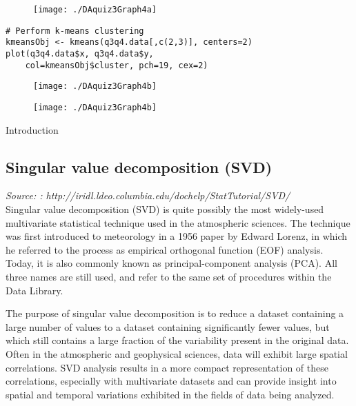 \documentclass[12pt]{article}
\begin{document}
\begin{figure}[h!]
\centering
\texttt{[image: ./DAquiz3Graph4a]}
\caption{}
\label{fig:DAquiz3Graph4a}
\end{figure}

\begin{framed}
\begin{verbatim}
# Perform k-means clustering
kmeansObj <- kmeans(q3q4.data[,c(2,3)], centers=2)
plot(q3q4.data$x, q3q4.data$y, 
    col=kmeansObj$cluster, pch=19, cex=2)
\end{verbatim}
\end{framed}
\begin{figure}
\centering
\texttt{[image: ./DAquiz3Graph4b]}
\caption{}
\label{What it should look like}
\end{figure}


\begin{figure}
\centering
\texttt{[image: ./DAquiz3Graph4b]}
\caption{}
\label{What it should look like}
\end{figure}

\newpage
\newpage

Introduction
\subsection*{Singular value decomposition (SVD)}
\textit{Source: : http://iridl.ldeo.columbia.edu/dochelp/StatTutorial/SVD/ \\}
Singular value decomposition (SVD) is quite possibly the most widely-used multivariate statistical technique used in the atmospheric sciences. The technique was first introduced to meteorology in a 1956 paper by Edward Lorenz, in which he referred to the process as empirical orthogonal function (EOF) analysis. Today, it is also commonly known as principal-component analysis (PCA). All three names are still used, and refer to the same set of procedures within the Data Library. 


The purpose of singular value decomposition is to reduce a dataset containing a large number of values to a dataset containing significantly fewer values, but which still contains a large fraction of the variability present in the original data. Often in the atmospheric and geophysical sciences, data will exhibit large spatial correlations. SVD analysis results in a more compact representation of these correlations, especially with multivariate datasets and can provide insight into spatial and temporal variations exhibited in the fields of data being analyzed. 
\end{document}
